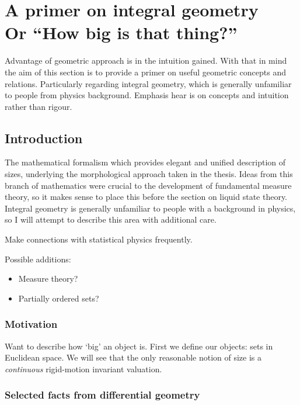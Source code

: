 \documentclass[12pt]{report}
\begin{document}
\chapter[A primer on integral geometry. Or ``How big is that thing?'']{A primer on integral geometry\\ {\large Or ``How big is that thing?''}}

Advantage of geometric approach is in the intuition gained.
With that in mind the aim of this section is to provide a primer on useful geometric concepts and relations.
Particularly regarding integral geometry, which is generally unfamiliar to people from physics background.
Emphasis hear is on concepts and intuition rather than rigour.

\section{Introduction}

The mathematical formalism which provides elegant and unified description of sizes, underlying the morphological approach taken in the thesis.
Ideas from this branch of mathematics were crucial to the development of fundamental measure theory, so it makes sense to place this before the section on liquid state theory.
Integral geometry is generally unfamiliar to people with a background in physics, so I will attempt to describe this area with additional care.

Make connections with statistical physics frequently.

Possible additions:
\begin{itemize}
\item Measure theory?
\item Partially ordered sets?
\end{itemize}

\subsection{Motivation}

Want to describe how `big' an object is.
First we define our objects: sets in Euclidean space.
We will see that the only reasonable notion of size is a \emph{continuous} rigid-motion invariant valuation.

\subsection{Selected facts from differential geometry}
\end{document}
